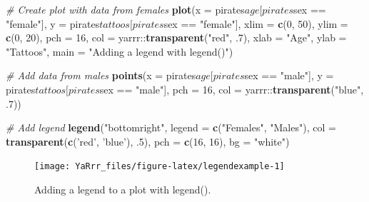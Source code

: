 \documentclass[]{book}
\newenvironment{Shaded}{\begin{snugshade}}{\end{snugshade}}
\newcommand{\KeywordTok}[1]{\textcolor[rgb]{0.13,0.29,0.53}{\textbf{{#1}}}}
\newcommand{\DataTypeTok}[1]{\textcolor[rgb]{0.13,0.29,0.53}{{#1}}}
\newcommand{\DecValTok}[1]{\textcolor[rgb]{0.00,0.00,0.81}{{#1}}}
\newcommand{\StringTok}[1]{\textcolor[rgb]{0.31,0.60,0.02}{{#1}}}
\newcommand{\CommentTok}[1]{\textcolor[rgb]{0.56,0.35,0.01}{\textit{{#1}}}}
\newcommand{\NormalTok}[1]{{#1}}
\theoremstyle{definition}
\theoremstyle{definition}
\theoremstyle{remark}
\begin{document}
\begin{Shaded}
\begin{Highlighting}[]
\CommentTok{# Create plot with data from females}
\KeywordTok{plot}\NormalTok{(}\DataTypeTok{x =} \NormalTok{pirates$age[pirates$sex ==}\StringTok{ "female"}\NormalTok{], }
     \DataTypeTok{y =} \NormalTok{pirates$tattoos[pirates$sex ==}\StringTok{ "female"}\NormalTok{],}
     \DataTypeTok{xlim =} \KeywordTok{c}\NormalTok{(}\DecValTok{0}\NormalTok{, }\DecValTok{50}\NormalTok{),}
     \DataTypeTok{ylim =} \KeywordTok{c}\NormalTok{(}\DecValTok{0}\NormalTok{, }\DecValTok{20}\NormalTok{),}
     \DataTypeTok{pch =} \DecValTok{16}\NormalTok{, }\DataTypeTok{col =} \NormalTok{yarrr::}\KeywordTok{transparent}\NormalTok{(}\StringTok{"red"}\NormalTok{, .}\DecValTok{7}\NormalTok{),}
     \DataTypeTok{xlab =} \StringTok{"Age"}\NormalTok{, }\DataTypeTok{ylab =} \StringTok{"Tattoos"}\NormalTok{, }
     \DataTypeTok{main =} \StringTok{"Adding a legend with legend()"}\NormalTok{)}

\CommentTok{# Add data from males}
\KeywordTok{points}\NormalTok{(}\DataTypeTok{x =} \NormalTok{pirates$age[pirates$sex ==}\StringTok{ "male"}\NormalTok{], }
       \DataTypeTok{y =} \NormalTok{pirates$tattoos[pirates$sex ==}\StringTok{ "male"}\NormalTok{],}
       \DataTypeTok{pch =} \DecValTok{16}\NormalTok{, }\DataTypeTok{col =} \NormalTok{yarrr::}\KeywordTok{transparent}\NormalTok{(}\StringTok{"blue"}\NormalTok{, .}\DecValTok{7}\NormalTok{))}

\CommentTok{# Add legend}
\KeywordTok{legend}\NormalTok{(}\StringTok{"bottomright"}\NormalTok{,}
       \DataTypeTok{legend =} \KeywordTok{c}\NormalTok{(}\StringTok{"Females"}\NormalTok{, }\StringTok{"Males"}\NormalTok{),}
       \DataTypeTok{col =} \KeywordTok{transparent}\NormalTok{(}\KeywordTok{c}\NormalTok{(}\StringTok{'red'}\NormalTok{, }\StringTok{'blue'}\NormalTok{), .}\DecValTok{5}\NormalTok{),}
       \DataTypeTok{pch =} \KeywordTok{c}\NormalTok{(}\DecValTok{16}\NormalTok{, }\DecValTok{16}\NormalTok{),}
       \DataTypeTok{bg =} \StringTok{"white"}\NormalTok{)}
\end{Highlighting}
\end{Shaded}

\begin{figure}

{\centering \texttt{[image: YaRrr\_files/figure-latex/legendexample-1]} 

}

\caption{Adding a legend to a plot with legend().}\label{fig:legendexample}
\end{figure}
\end{document}
